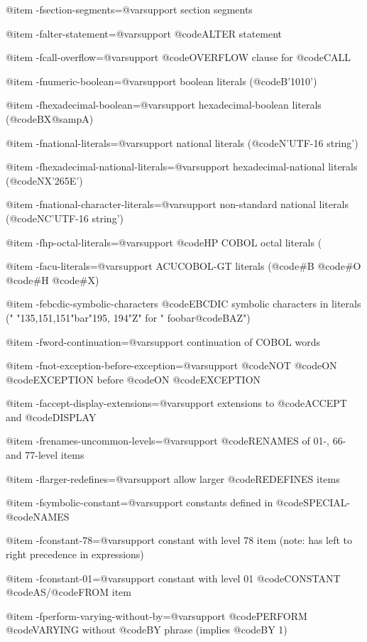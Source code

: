 @item -fsection-segments=@var{support}
section segments

@item -falter-statement=@var{support}
@code{ALTER} statement

@item -fcall-overflow=@var{support}
@code{OVERFLOW} clause for @code{CALL}

@item -fnumeric-boolean=@var{support}
boolean literals (@code{B'1010'})

@item -fhexadecimal-boolean=@var{support}
hexadecimal-boolean literals (@code{BX}@samp{A})

@item -fnational-literals=@var{support}
national literals (@code{N'UTF}-16 string')

@item -fhexadecimal-national-literals=@var{support}
hexadecimal-national literals (@code{NX'265E'})

@item -fnational-character-literals=@var{support}
non-standard national literals (@code{NC'UTF}-16 string')

@item -fhp-octal-literals=@var{support}
@code{HP} COBOL octal literals (%

@item -facu-literals=@var{support}
ACUCOBOL-GT literals (@code{#B} @code{#O} @code{#H} @code{#X})

@item -febcdic-symbolic-characters
@code{EBCDIC} symbolic characters in literals (" "135,151,151"bar"195, 194"Z" for " foobar@code{BAZ}")

@item -fword-continuation=@var{support}
continuation of COBOL words

@item -fnot-exception-before-exception=@var{support}
@code{NOT} @code{ON} @code{EXCEPTION} before @code{ON} @code{EXCEPTION}

@item -faccept-display-extensions=@var{support}
extensions to @code{ACCEPT} and @code{DISPLAY}

@item -frenames-uncommon-levels=@var{support}
@code{RENAMES} of 01-, 66- and 77-level items

@item -flarger-redefines=@var{support}
allow larger @code{REDEFINES} items

@item -fsymbolic-constant=@var{support}
constants defined in @code{SPECIAL}-@code{NAMES}

@item -fconstant-78=@var{support}
constant with level 78 item (note: has left to right precedence in expressions)

@item -fconstant-01=@var{support}
constant with level 01 @code{CONSTANT} @code{AS}/@code{FROM} item

@item -fperform-varying-without-by=@var{support}
@code{PERFORM} @code{VARYING} without @code{BY} phrase (implies @code{BY 1})

